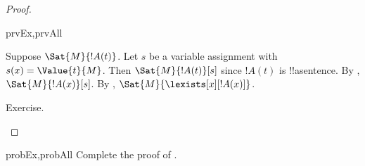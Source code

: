 \begin{proof}
  \begin{tagenumerate}{prvEx,prvAll}
    
      Suppose $\Sat{M}{!A(t)}$. Let $s$ be a
        variable assignment with $s(x) = \Value{t}{M}$. Then
        $\Sat{M}{!A(t)}[s]$ since $!A(t)$ is !!a{sentence}. By
        , $\Sat{M}{!A(x)}[s]$. By
        ,
        $\Sat{M}{\lexists[x][!A(x)]}$.
    
      Exercise.
  \end{tagenumerate}
\end{proof}

\begin{probtag}{probEx,probAll}
  Complete the proof of .
\end{probtag} 



\OLEndChapterHook





